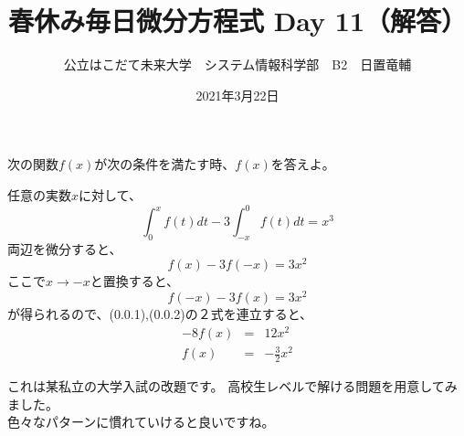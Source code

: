\documentclass[dvipdfmx,uplatex]{jsarticle}
\title{春休み毎日微分方程式 Day 11（解答）}
\author{公立はこだて未来大学　システム情報科学部　B2　日置竜輔}
\date{2021年3月22日}
\begin{document}
\begin{spacing}{1.6}
\maketitle

次の関数$f(x)$が次の条件を満たす時、$f(x)$を答えよ。\\
\begin{qparts}
  \qpart 任意の実数$x$に対して、
  \begin{equation*}
    \int_0^x f(t)dt - 3\int_{-x}^0 f(t)dt = x^3
  \end{equation*}
  両辺を微分すると、
  \begin{equation}
    f(x) - 3f(-x) = 3x^2
  \end{equation}
  ここで$x \rightarrow -x$と置換すると、
  \begin{equation}
    f(-x) - 3f(x) = 3x^2
  \end{equation}
  が得られるので、(0.0.1),(0.0.2)の２式を連立すると、
  \begin{eqnarray*}
    -8f(x) & = & 12x^2 \\
    f(x) & = & - \frac{3}{2}x^2
  \end{eqnarray*}
  \end{qparts}
  \end{spacing}
  \begin{shadebox}
    これは某私立の大学入試の改題です。 
    高校生レベルで解ける問題を用意してみました。 \\
    色々なパターンに慣れていけると良いですね。
  \end{shadebox}
\end{document}
